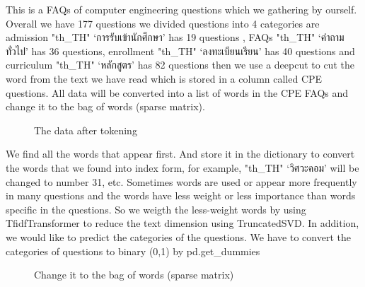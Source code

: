 \documentclass[12pt,oneside,openright,a4paper]{cpe-english-project}
\begin{document}
This is a FAQs of computer engineering questions which we gathering by ourself. Overall we have 177 questions we divided questions into 4 categories are admission{
\XeTeXlinebreaklocale "th_TH"	
\thaifont 
 ‘การรับเข้านักศึกษา’ } has 19 questions , FAQs {
\XeTeXlinebreaklocale "th_TH"	
\thaifont 
 ‘คำถามทั่วไป’ }has 36 questions, enrollment {
\XeTeXlinebreaklocale "th_TH"	
\thaifont 
 ‘ลงทะเบียนเรียน’ }has 40 questions and curriculum {
\XeTeXlinebreaklocale "th_TH"	
\thaifont 
 ‘หลักสูตร’ }has 82 questions then we use a deepcut to cut the word from the text we have read which is stored in a column called CPE questions. All data will be converted into a list of words in the CPE FAQs and change it to the bag of words (sparse matrix).
\begin{figure}[!h]\centering
{}
\caption{The data after tokening}\label{fig:The data after tokening}
\end{figure}
We find all the words that appear first. And store it in the dictionary to convert the words that we found into index form, for example,{
\XeTeXlinebreaklocale "th_TH"	
\thaifont 
 ‘วิศวะคอม’ } will be changed to number 31, etc.
Sometimes words  are used or appear more frequently in many questions and the words have less weight or less importance than words specific in the questions. So we weigth the less-weight words by using TfidfTransformer to reduce the text dimension using TruncatedSVD.
In addition, we would like to predict the categories of the questions. We have to convert the categories of questions to binary (0,1) by pd.get\_dummies
\begin{figure}[!h]\centering
{}
\caption{Change it to the bag of words (sparse matrix)}\label{fig:Change it to the bag of words (sparse matrix)}
\end{figure}
\end{document}
